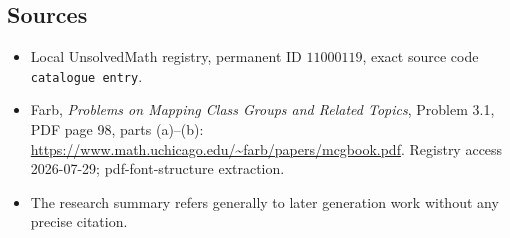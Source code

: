 \documentclass[11pt]{article}
\begin{document}
\subsection{Sources}
\begin{itemize}
\item Local UnsolvedMath registry, permanent ID \(11000119\), exact source code \texttt{catalogue entry}.
\item Farb, \emph{Problems on Mapping Class Groups and Related Topics}, Problem 3.1, PDF page 98, parts (a)--(b): \url{https://www.math.uchicago.edu/~farb/papers/mcgbook.pdf}. Registry access 2026-07-29; pdf-font-structure extraction.
\item The research summary refers generally to later generation work without any precise citation.
\end{itemize}
\end{document}
